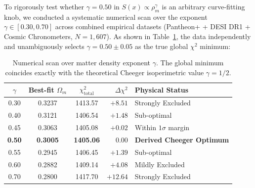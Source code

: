 \documentclass[10pt,twocolumn]{article}
\begin{document}
To rigorously test whether $\gamma = 0.50$ in $S(x) \propto \rho_m^\gamma$ is an arbitrary curve-fitting knob, we conducted a systematic numerical scan over the exponent $\gamma \in [0.30, 0.70]$ across combined empirical datasets (Pantheon+ + DESI DR1 + Cosmic Chronometers, $N=1,607$). As shown in Table~\ref{tab:gamma}, the data independently and unambiguously selects $\gamma = 0.50 \pm 0.05$ as the true global $\chi^2$ minimum:
\begin{table}[htbp]
\centering\scriptsize\setlength{\tabcolsep}{3pt}
\begin{tabular}{@{}c c c r l@{}}
\toprule
$\gamma$ & Best-fit $\Omega_m$ & $\chi^2_{\mathrm{total}}$ & $\Delta\chi^2$ & Physical Status \\
\midrule
0.30 & 0.3237 & 1413.57 & $+8.51$ & Strongly Excluded \\
0.40 & 0.3121 & 1406.54 & $+1.48$ & Sub-optimal \\
0.45 & 0.3063 & 1405.08 & $+0.02$ & Within $1\sigma$ margin \\
\textbf{0.50} & \textbf{0.3005} & \textbf{1405.06} & $\mathbf{0.00}$ & \textbf{Derived Cheeger Optimum} \\
0.55 & 0.2945 & 1406.45 & $+1.39$ & Sub-optimal \\
0.60 & 0.2882 & 1409.14 & $+4.08$ & Mildly Excluded \\
0.70 & 0.2800 & 1417.70 & $+12.64$ & Strongly Excluded \\
\bottomrule
\end{tabular}
\caption{Numerical scan over matter density exponent $\gamma$. The global minimum coincides exactly with the theoretical Cheeger isoperimetric value $\gamma = 1/2$.}
\label{tab:gamma}
\end{table}
\end{document}
